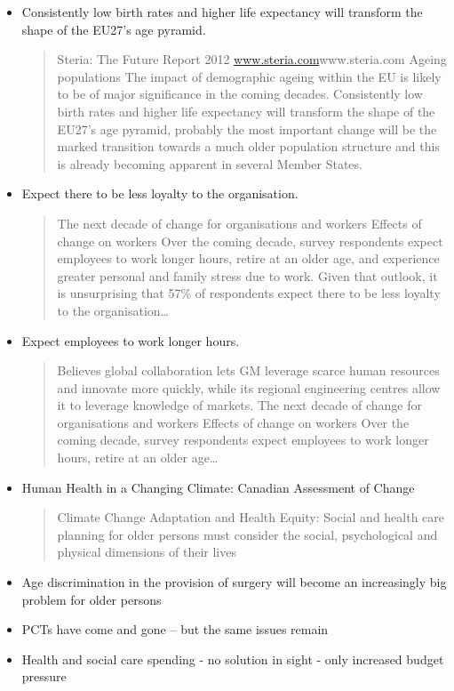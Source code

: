 \begin{itemize}
	\item Consistently low birth rates and higher life expectancy will transform the shape of the EU27's age pyramid.
	\begin{quotation}Steria: The Future Report 2012 \url{www.steria.com}{www.steria.com} Ageing populations The impact of demographic ageing within the EU is likely to be of major significance in the coming decades. Consistently low birth rates and higher life expectancy will transform the shape of the EU27's age pyramid, probably the most important change will be the marked transition towards a much older population structure and this is already becoming apparent in several Member States.\end{quotation}
	\item Expect there to be less loyalty to the organisation.
	\begin{quotation}
		The next decade of change for organisations and workers Effects of change on workers Over the coming decade, survey respondents expect employees to work longer hours, retire at an older age, and experience greater personal and family stress due to work. Given that outlook, it is unsurprising that 57\% of respondents expect there to be less loyalty to the organisation\dots\end{quotation}
	\item Expect employees to work longer hours.
	\begin{quotation}
		Believes global collaboration lets GM leverage scarce human resources and innovate more quickly, while its regional engineering centres allow it to leverage knowledge of markets. The next decade of change for organisations and workers Effects of change on workers Over the coming decade, survey respondents expect employees to work longer hours, retire at an older age\ldots\end{quotation}
	\item Human Health  in a Changing Climate: Canadian Assessment of Change
	\begin{quotation}
		Climate Change Adaptation and Health Equity: Social and health care planning for older persons must consider the social, psychological and physical dimensions of their lives\end{quotation}
	\item Age discrimination in the provision of surgery will become an increasingly big problem for older persons
	\item PCTs have come and gone -- but the same issues remain
	\item Health and social care spending - no solution in sight - only increased budget pressure

\end{itemize}
